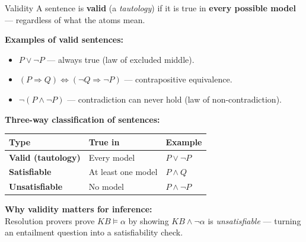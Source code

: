\documentclass[10pt]{beamer}
\begin{document}
\begin{frame}{Validity}
    \small
    A sentence is \textbf{valid} (a \emph{tautology}) if it is true in \textbf{every possible model} — regardless of what the atoms mean.

    \vspace{0.06cm}
    \textbf{Examples of valid sentences:}
    \begin{itemize}\setlength{\itemsep}{1pt}
        \item $P \lor \neg P$ \;— always true (law of excluded middle).
        \item $(P \Rightarrow Q) \Leftrightarrow (\neg Q \Rightarrow \neg P)$ \;— contrapositive equivalence.
        \item $\neg (P \land \neg P)$ \;— contradiction can never hold (law of non-contradiction).
    \end{itemize}

    \vspace{0.06cm}
    \textbf{Three-way classification of sentences:}
    \begin{center}
    \renewcommand{\arraystretch}{1.1}
    \begin{tabular}{>{\bfseries}lll}
        \toprule
        Type & True in & Example \\
        \midrule
        Valid (tautology) & Every model & $P \lor \neg P$ \\
        Satisfiable & At least one model & $P \land Q$ \\
        Unsatisfiable & No model & $P \land \neg P$ \\
        \bottomrule
    \end{tabular}
    \end{center}

    \vspace{0.06cm}
    \textbf{Why validity matters for inference:}\\
    Resolution provers prove $KB \models \alpha$ by showing $KB \land \neg\alpha$ is \emph{unsatisfiable} —
    turning an entailment question into a satisfiability check.
\end{frame}
\end{document}
